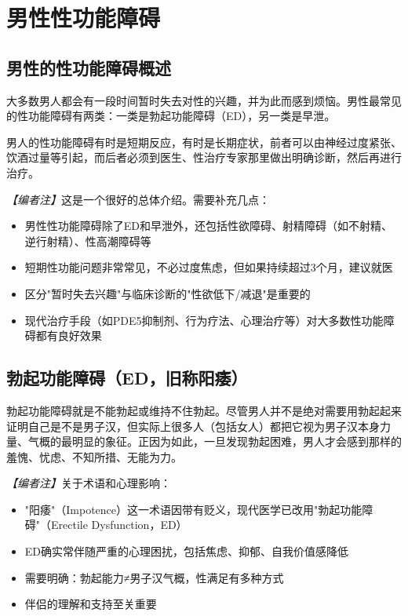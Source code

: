 \documentclass[12pt,a4paper,twoside]{ctexbook}
\begin{document}
\chapter{男性性功能障碍}

\section{男性的性功能障碍概述}


大多数男人都会有一段时间暂时失去对性的兴趣，并为此而感到烦恼。男性最常见的性功能障碍有两类：一类是勃起功能障碍（ED），另一类是早泄。

男人的性功能障碍有时是短期反应，有时是长期症状，前者可以由神经过度紧张、饮酒过量等引起，而后者必须到医生、性治疗专家那里做出明确诊断，然后再进行治疗。

\noindent\textit{【编者注】}这是一个很好的总体介绍。需要补充几点：
\begin{itemize}
	\item 男性性功能障碍除了ED和早泄外，还包括性欲障碍、射精障碍（如不射精、逆行射精）、性高潮障碍等
	\item 短期性功能问题非常常见，不必过度焦虑，但如果持续超过3个月，建议就医
	\item 区分"暂时失去兴趣"与临床诊断的"性欲低下/减退"是重要的
	\item 现代治疗手段（如PDE5抑制剂、行为疗法、心理治疗等）对大多数性功能障碍都有良好效果
\end{itemize}

\section{勃起功能障碍（ED，旧称阳痿）}


勃起功能障碍就是不能勃起或维持不住勃起。尽管男人并不是绝对需要用勃起起来证明自己是不是男子汉，但实际上很多人（包括女人）都把它视为男子汉本身力量、气概的最明显的象征。正因为如此，一旦发现勃起困难，男人才会感到那样的羞愧、忧虑、不知所措、无能为力。

\noindent\textit{【编者注】}关于术语和心理影响：
\begin{itemize}
	\item "阳痿"（Impotence）这一术语因带有贬义，现代医学已改用"勃起功能障碍"（Erectile Dysfunction，ED）
	\item ED确实常伴随严重的心理困扰，包括焦虑、抑郁、自我价值感降低
	\item 需要明确：勃起能力≠男子汉气概，性满足有多种方式
	\item 伴侣的理解和支持至关重要
\end{itemize}
\end{document}
